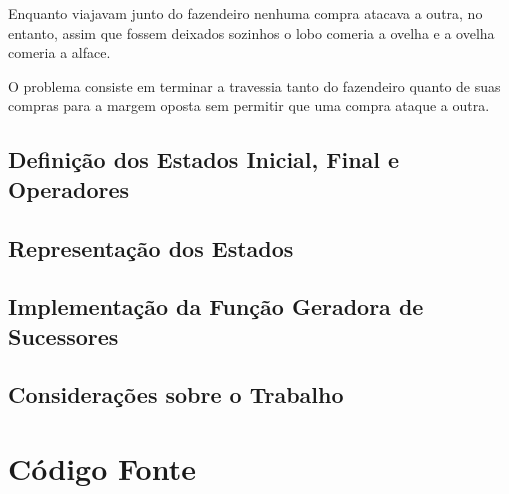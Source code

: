 \documentclass[brazil,times]{abnt}
\begin{document}
	Enquanto viajavam junto do fazendeiro nenhuma compra atacava a outra, no
	entanto, assim que fossem deixados sozinhos o lobo comeria a ovelha e a
	ovelha comeria a alface.
	
	O problema consiste em terminar a travessia tanto do fazendeiro
	quanto de suas compras para a margem oposta sem permitir que uma compra ataque
	a outra.

\section*{Definição dos Estados Inicial, Final e Operadores}
	


\section*{Representação dos Estados}


\section*{Implementação da Função Geradora de Sucessores}


\section*{Considerações sobre o Trabalho}


\chapter*{Código Fonte}
	



\end{document}
